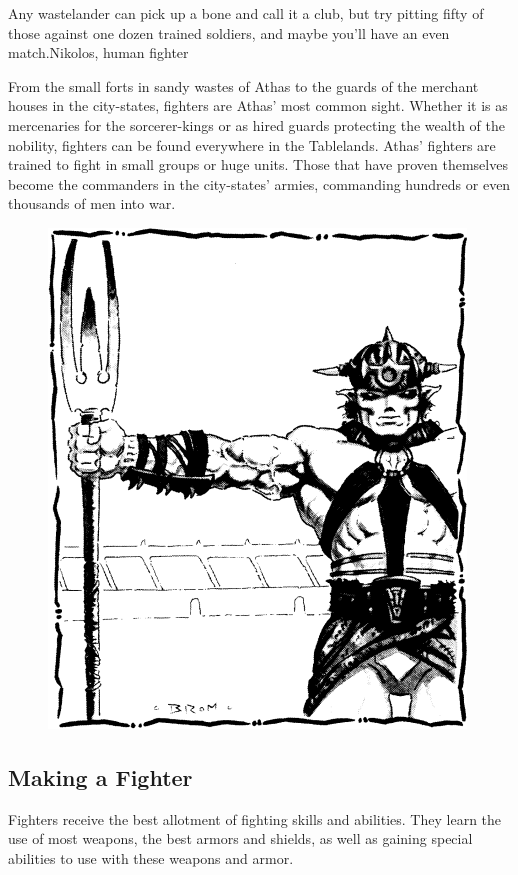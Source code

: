 {Any wastelander can pick up a bone and call it a club, but try pitting fifty of those against one dozen trained soldiers, and maybe you'll have an even match.}{Nikolos, human fighter}

From the small forts in sandy wastes of Athas to the guards of the merchant houses in the city-states, fighters are Athas' most common sight. Whether it is as mercenaries for the sorcerer-kings or as hired guards protecting the wealth of the nobility, fighters can be found everywhere in the Tablelands. Athas' fighters are trained to fight in small groups or huge units. Those that have proven themselves become the commanders in the city-states' armies, commanding hundreds or even thousands of men into war.

\begin{figure}[b!]
\centering
\includegraphics[width=\columnwidth]{images/gladiator-1.png}
\WOTC
\end{figure}

\subsection{Making a Fighter}
Fighters receive the best allotment of fighting skills and abilities. They learn the use of most weapons, the best armors and shields, as well as gaining special abilities to use with these weapons and armor.


